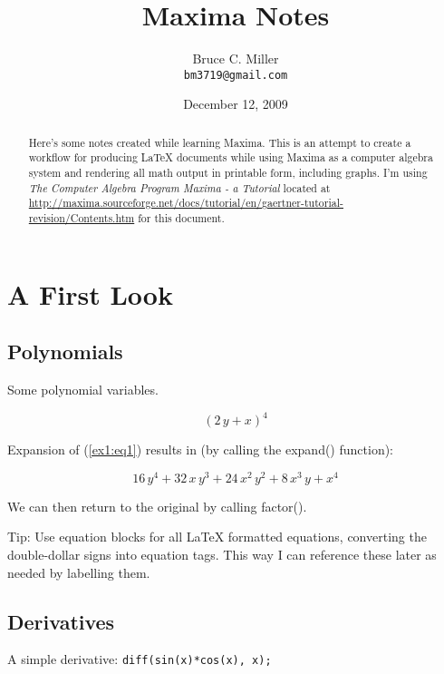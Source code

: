 \documentclass[a4paper,12pt]{article}
\begin{document}
\title{Maxima Notes}
\author{Bruce C. Miller \\
{\tt bm3719@gmail.com}}
\date{December 12, 2009}
\maketitle

\begin{abstract}
  Here's some notes created while learning Maxima.  This is an attempt to
  create a workflow for producing \LaTeX{} documents while using Maxima as a
  computer algebra system and rendering all math output in printable form,
  including graphs.  I'm using \emph{The Computer Algebra Program Maxima - a
    Tutorial} located at
  \url{http://maxima.sourceforge.net/docs/tutorial/en/gaertner-tutorial-revision/Contents.htm}
  for this document.
\end{abstract}

\tableofcontents 
\setcounter{tocdepth}{2}

\section{A First Look}

\subsection{Polynomials}
Some polynomial variables.

\begin{equation}
\left(2\,y+x\right)^4
\label{ex1:eq1}
\end{equation}

Expansion of (\ref{ex1:eq1}) results in (by calling the expand() function):

\begin{equation}
16\,y^4+32\,x\,y^3+24\,x^2\,y^2+8\,x^3\,y+x^4
\end{equation}

We can then return to the original by calling factor().

Tip: Use equation blocks for all \LaTeX{} formatted equations, converting the
double-dollar signs into equation tags.  This way I can reference these later
as needed by labelling them.

\subsection{Derivatives}
A simple derivative: \texttt{diff(sin(x)*cos(x), x);}
\end{document}

